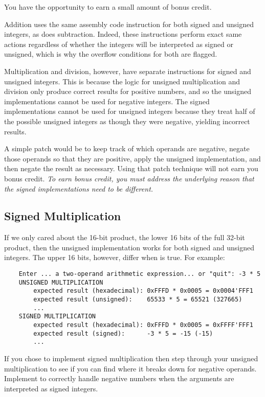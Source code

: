 You have the opportunity to earn a small amount of bonus credit.

Addition uses the same assembly code instruction for both signed and unsigned integers, as does subtraction.
Indeed, these instructions perform exact same actions regardless of whether the integers will be interpreted as signed or unsigned, which is why the overflow conditions for both are flagged.

Multiplication and division, however, have separate instructions for signed and unsigned integers.
This is because the logic for unsigned multiplication and division only produce correct results for positive numbers, and so the unsigned implementations cannot be used for negative integers.
The signed implementations cannot be used for unsigned integers because they treat half of the possible unsigned integers as though they were negative, yielding incorrect results.

A simple patch would be to keep track of which operands are negative, negate those operands so that they are positive, apply the unsigned implementation, and then negate the result as necessary.
Using that patch technique will not earn you bonus credit.
\textit{To earn bonus credit, you must address the underlying reason that the signed implementations need to be different.}

\subsection{Signed Multiplication}

If we only cared about the 16-bit product, the lower 16 bits of the full 32-bit product, then the unsigned implementation works for both signed and unsigned integers.
The upper 16 bits, however, differ when  is true.
For example:
\begin{verbatim}
    Enter ... a two-operand arithmetic expression... or "quit": -3 * 5
    UNSIGNED MULTIPLICATION
        expected result (hexadecimal): 0xFFFD * 0x0005 = 0x0004'FFF1
        expected result (unsigned):    65533 * 5 = 65521 (327665)
        ...
    SIGNED MULTIPLICATION
        expected result (hexadecimal): 0xFFFD * 0x0005 = 0xFFFF'FFF1
        expected result (signed):      -3 * 5 = -15 (-15)
        ...
\end{verbatim}

If you chose to implement signed multiplication then step through your unsigned multiplication to see if you can find where it breaks down for negative operands.
Implement  to correctly handle negative numbers when the arguments are interpreted as signed integers.

